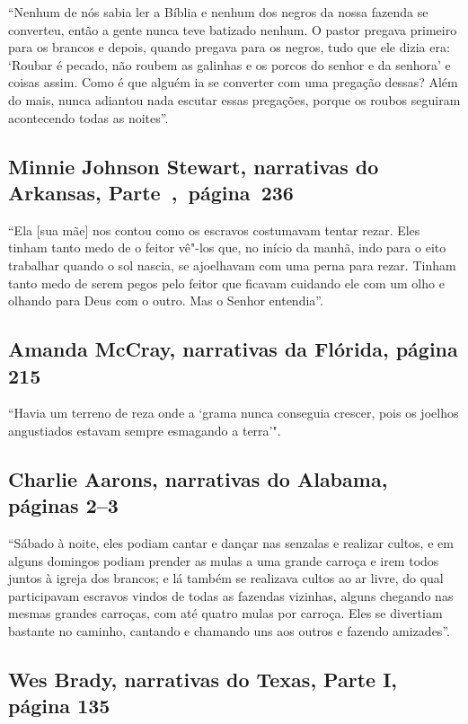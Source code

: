 ``Nenhum de nós sabia ler a Bíblia e nenhum dos negros da nossa fazenda
se converteu, então a gente nunca teve batizado nenhum. O pastor pregava
primeiro para os brancos e depois, quando pregava para os negros, tudo
que ele dizia era: `Roubar é pecado, não roubem as galinhas e os porcos
do senhor e da senhora' e coisas assim. Como é que alguém ia se
converter com uma pregação dessas? Além do mais, nunca adiantou nada
escutar essas pregações, porque os roubos seguiram acontecendo todas as
noites''.

\subsection{Minnie Johnson Stewart, narrativas do Arkansas, Parte~,~página~236}
\label{ref253} 

``Ela {[}sua mãe{]} nos contou como os escravos costumavam tentar rezar.
Eles tinham tanto medo de o feitor vê"-los que, no início da manhã, indo
para o eito trabalhar quando o sol nascia, se ajoelhavam com uma perna
para rezar. Tinham tanto medo de serem pegos pelo feitor que ficavam
cuidando ele com um olho e olhando para Deus com o outro. Mas o Senhor
entendia''.

\subsection{Amanda McCray, narrativas da Flórida, página 215}
\label{ref185}

``Havia um terreno de reza onde a `grama nunca conseguia crescer, pois
os joelhos angustiados estavam sempre esmagando a terra'".

\subsection{Charlie Aarons, narrativas do Alabama, páginas 2--3} \label{ref02}

``Sábado à noite, eles podiam cantar e dançar nas senzalas e realizar
cultos, e em alguns domingos podiam prender as mulas a uma grande
carroça e irem todos juntos à igreja dos brancos; e lá também se
realizava cultos ao ar livre, do qual participavam escravos vindos de
todas as fazendas vizinhas, alguns chegando nas mesmas grandes carroças,
com até quatro mulas por carroça. Eles se divertiam bastante no caminho,
cantando e chamando uns aos outros e fazendo amizades''.

\subsection{Wes Brady, narrativas do Texas, Parte I, página 135} \label{ref32}

